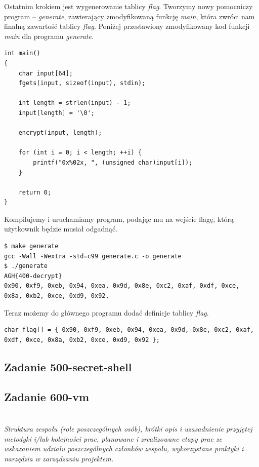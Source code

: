 \documentclass[polish,12pt]{aghthesis}
\begin{document}
\clearpage
Ostatnim krokiem jest wygenerowanie tablicy \emph{flag}. Tworzymy nowy pomocniczy program
-- \emph{generate}, zawierający zmodyfikowaną funkcję \emph{main},
która zwróci nam finalną zawartość tablicy \emph{flag}.
Poniżej przestawiony zmodyfikowany kod funkcji \emph{main} dla programu \emph{generate}.

\begin{verbatim}
int main()
{
    char input[64];
    fgets(input, sizeof(input), stdin);

    int length = strlen(input) - 1;
    input[length] = '\0';

    encrypt(input, length);

    for (int i = 0; i < length; ++i) {
        printf("0x%02x, ", (unsigned char)input[i]);
    }

    return 0;
}
\end{verbatim}

Kompilujemy i uruchamiamy program, podając mu na wejście flagę, którą użytkownik będzie musiał odgadnąć.

\begin{verbatim}
$ make generate
gcc -Wall -Wextra -std=c99 generate.c -o generate
$ ./generate
AGH{400-decrypt}
0x90, 0xf9, 0xeb, 0x94, 0xea, 0x9d, 0x8e, 0xc2, 0xaf, 0xdf, 0xce, 0x8a, 0xb2, 0xce, 0xd9, 0x92,
\end{verbatim}

Teraz możemy do głównego programu dodać definicje tablicy \emph{flag}.

\begin{verbatim}
char flag[] = { 0x90, 0xf9, 0xeb, 0x94, 0xea, 0x9d, 0x8e, 0xc2, 0xaf, 0xdf, 0xce, 0x8a, 0xb2, 0xce, 0xd9, 0x92 };
\end{verbatim}
\clearpage

\subsection{Zadanie 500-secret-shell}

\subsection{Zadanie 600-vm}

\clearpage

\section{\SectionTitleWorkOrganization}
\label{sec:organizacja-pracy}
\emph{Struktura zespołu (role poszczególnych osób), krótki opis i
    uzasadnienie przyjętej metodyki i/lub kolejności prac, planowane i
    zrealizowane etapy prac ze wskazaniem udziału poszczególnych
    członków zespołu, wykorzystane praktyki i narzędzia w zarządzaniu
    projektem.}
\end{document}
